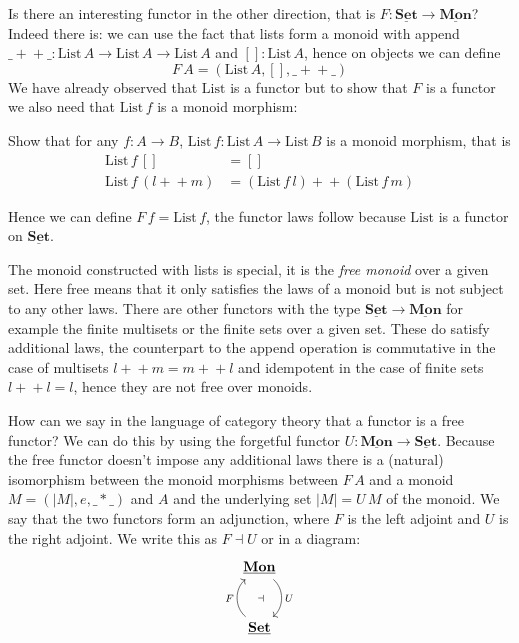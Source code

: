 \documentclass{article}
\newcommand{\Set}{\mathbf{Set}}
\newcommand{\cat}[1]{\underline{\mathbf{#1}}}
\newcommand{\List}{\mathrm{List}}
\newcommand{\app}{+\!\!+}
\begin{document}
Is there an interesting functor in the other direction, that is $F : \cat{\Set} \to \cat{Mon}$? Indeed there is: we can use the fact that lists form a monoid with append $\_\app\_ : \List\,A \to \List\,A \to \List\,A$ and $[] : \List\,A$, hence on objects we can define
\[ F\,A = (\List\,A, [], \_\app\_) \]
We have already observed that $\List$ is a functor but to show that $F$ is a functor we also need that $\List\,f$ is a monoid morphism:
\begin{Exercise}
  Show that for any $f:A \to B$, $\List\,f : \List\,A \to \List\,B$ is a monoid morphism, that is
  \begin{align*}
    \List\,f\,[] & = [] \\
    \List\,f\,(l \app m) & = (\List\,f\,l) \app (\List\,f\,m)
  \end{align*}
\end{Exercise}
Hence we can define $F\,f = \List\,f$, the functor laws follow because $\List$ is a functor on $\cat{\Set}$.

The monoid constructed with lists is special, it is the \emph{free monoid} over a given set. Here free means that it only satisfies the laws of a monoid but is not subject to any other laws. There are other functors with the type $\cat{\Set} \to \cat{Mon}$ for example the finite multisets or the finite sets over a given set. These do satisfy additional laws, the counterpart to the append operation is commutative in the case of multisets $l \app m = m \app l$ and idempotent in the case of finite sets $l \app l = l$, hence they are not free over monoids.

How can we say in the language of category theory that a functor is a free functor? We can do this by using the forgetful functor $U: \cat{Mon} \to \cat{Set}$. Because the free functor doesn't impose any additional laws there is a (natural) isomorphism between the monoid morphisms between $F\,A$ and a monoid $M = (|M|,e,\_*\_)$ and $A$ and the underlying set $|M| = U\,M$
of the monoid. We say that the two functors form an adjunction, where $F$ is the left adjoint and $U$ is the right adjoint. We write this as $F \dashv U$ or in a diagram:
\[\begin{tikzcd}[row sep=large]
\cat{Mon} \arrow[d,bend left = 50,"U" right,"\dashv" left = 10] \\ 
\cat{Set} \arrow[u,bend left = 50,"F" left, ]
\end{tikzcd}\]
\end{document}
